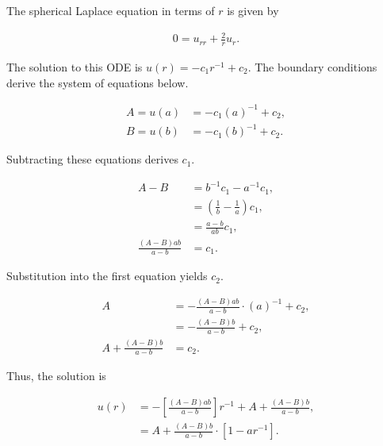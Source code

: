 \documentclass[a4paper, 10pt]{article}
\newenvironment{answer}[1][Answer]{\begin{trivlist}
\item[\hskip\labelsep{\textit{#1.}}]}{\end{trivlist}}
\begin{document}
\begin{answer}
    The spherical Laplace equation in terms of $r$ is given by
    
    \begin{align*}
        0 = u_{r r} + \frac{2}{r} u_r. 
    \end{align*}

    The solution to this ODE is $u(r) =-c_1 r^{-1} + c_2$. The boundary conditions derive the system of equations below. 
    
    \begin{align*}
        A = u(a) &= - c_1 (a)^{-1} + c_2,\\
        B = u(b) &= - c_1 (b)^{-1} + c_2.
    \end{align*}

    Subtracting these equations derives $c_1$.
    
    \begin{align*}
        A - B &= b^{-1} c_1 - a^{-1} c_1,\\
              &= \left( \frac{1}{b} - \frac{1}{a} \right) c_1,\\
              &= \frac{a - b}{a b} c_1,\\
        \frac{(A - B)a b}{a - b}  &= c_1.
    \end{align*}

    Substitution into the first equation yields $c_2$. 

    \begin{align*}
        A &= - \frac{(A - B)a b}{a - b} \cdot (a)^{-1} + c_2,\\
          &= - \frac{(A - B) b}{a - b} + c_2,\\
        A + \frac{(A - B) b}{a - b} &= c_2.
    \end{align*}

    Thus, the solution is 

    \begin{align*}
        u(r) &= - \left[\frac{(A - B)a b}{a - b} \right] r^{-1} + A + \frac{(A - B) b}{a - b},\\
             &= A + \frac{(A - B) b}{a - b} \cdot \left[1 - a r^{-1} \right].
    \end{align*}
\end{answer}
\end{document}
